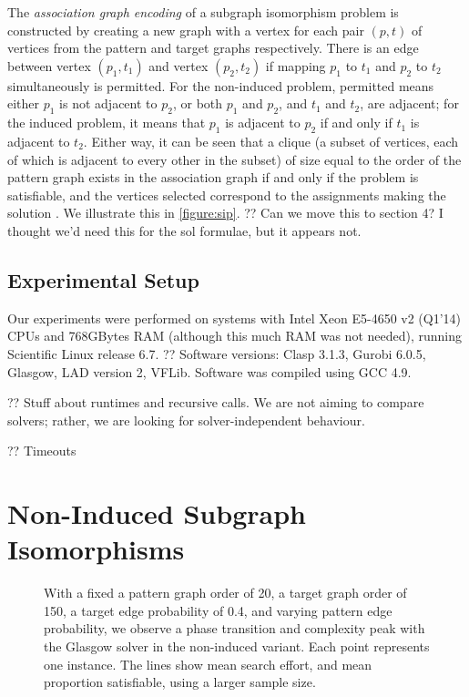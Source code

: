 \documentclass[letterpaper]{article}
\begin{document}
The \emph{association graph encoding} of a subgraph isomorphism problem is constructed by creating a
new graph with a vertex for each pair $(p, t)$ of vertices from the pattern and target graphs
respectively. There is an edge between vertex $(p_1, t_1)$ and vertex $(p_2, t_2)$ if mapping $p_1$
to $t_1$ and $p_2$ to $t_2$ simultaneously is permitted. For the non-induced problem, permitted
means either $p_1$ is not adjacent to $p_2$, or both $p_1$ and $p_2$, and $t_1$ and $t_2$, are
adjacent; for the induced problem, it means that $p_1$ is adjacent to $p_2$ if and only if $t_1$ is
adjacent to $t_2$. Either way, it can be seen that a clique (a subset of vertices, each of which is
adjacent to every other in the subset) of size equal to the order of the pattern graph exists in the
association graph if and only if the problem is satisfiable, and the vertices selected correspond to
the assignments making the solution \citep{Levi:1973}. We illustrate this in
\cref{figure:sip}. ?? Can we move this to section 4? I thought we'd need this for the sol formulae,
but it appears not.

\subsection{Experimental Setup}

Our experiments were performed on systems with Intel Xeon E5-4650 v2 (Q1'14) CPUs and 768GBytes RAM
(although this much RAM was not needed), running Scientific Linux release 6.7.   ?? Software
versions: Clasp 3.1.3, Gurobi 6.0.5, Glasgow, LAD version 2, VFLib. Software was compiled using GCC
4.9.

?? Stuff about runtimes and recursive calls. We are not aiming to compare solvers; rather, we are
looking for solver-independent behaviour.

?? Timeouts

\section{Non-Induced Subgraph Isomorphisms}

\begin{figure}[tb]
    
    \caption{With a fixed a pattern graph order of 20, a target graph order of 150, a target edge
        probability of 0.4, and varying pattern edge probability, we observe a phase transition and
        complexity peak with the Glasgow solver in the non-induced variant. Each point represents
        one instance. The lines show mean search effort, and mean proportion satisfiable, using a
    larger sample size.}
    \label{figure:phase-transition}
\end{figure}
\end{document}
